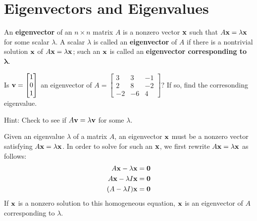 \section{Eigenvectors and Eigenvalues}
\name

\begin{boxdef}
	An \textbf{eigenvector} of an $n\times n$ matrix $A$ is a nonzero vector $\boldsymbol{\mathbf{x}}$ such that $A\boldsymbol{\mathbf{x}}=\lambda\boldsymbol{\mathbf{x}}$ for some scalar $\lambda$. A scalar $\lambda$ is called an \textbf{eigenvector} of $A$ if there is a nontrivial solution $\boldsymbol{\mathbf{x}}$ of $A\boldsymbol{\mathbf{x}}=\lambda\boldsymbol{\mathbf{x}}$; such an $\boldsymbol{\mathbf{x}}$ is called an \textbf{eigenvector corresponding to $\boldsymbol{\lambda}$}.
\end{boxdef}

\begin{exercise} %
	Is $\boldsymbol{\mathbf{v}}=\begin{bmatrix}1\\0\\1\end{bmatrix}$ an eigenvector of $A=\begin{bmatrix}3&3&-1\\2&8&-2\\-2&-6&4\end{bmatrix}$? If so, find the corresonding eigenvalue.
	
	Hint: Check to see if $A\boldsymbol{\mathbf{v}}=\lambda\boldsymbol{\mathbf{v}}$ for some $\lambda$.
\end{exercise}
\vfill


\begin{boxme}
	Given an eigenvalue $\lambda$ of a matrix $A$, an eigenvector $\boldsymbol{\mathbf{x}}$ must be a nonzero vector satisfying $A\boldsymbol{\mathbf{x}}=\lambda\boldsymbol{\mathbf{x}}$. In order to solve for such an $\boldsymbol{\mathbf{x}}$, we first rewrite $A\boldsymbol{\mathbf{x}}=\lambda\boldsymbol{\mathbf{x}}$ as follows:
	\begin{align*}
	A\boldsymbol{\mathbf{x}} - \lambda\boldsymbol{\mathbf{x}} &= \boldsymbol{\mathbf{0}} \\
	A\boldsymbol{\mathbf{x}} - \lambda I\boldsymbol{\mathbf{x}} &= \boldsymbol{\mathbf{0}} \\
	(A-\lambda I)\boldsymbol{\mathbf{x}} &= \boldsymbol{\mathbf{0}}
	\end{align*}
	If $\boldsymbol{\mathbf{x}}$ is a nonzero solution to this homogeneous equation, $\boldsymbol{\mathbf{x}}$ is an eigenvector of $A$ corresponding to $\lambda$.
\end{boxme}

